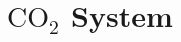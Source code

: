 \documentclass[../../main]{subfiles}
\begin{document}
\section{$\mbox{CO}_2$ System} \label{sec:}
\end{document}
